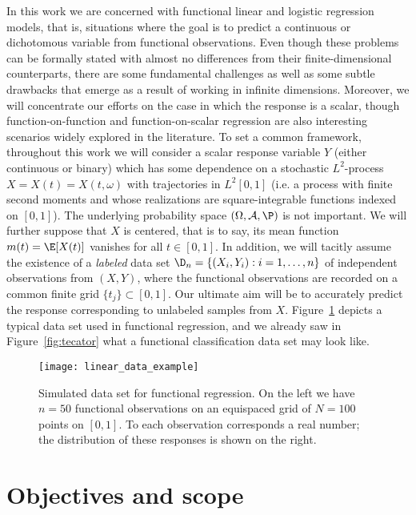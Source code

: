 In this work we are concerned with functional linear and logistic regression models, that is, situations where the goal is to predict a continuous or dichotomous variable from functional observations. Even though these problems can be formally stated with almost no differences from their finite-dimensional counterparts, there are some fundamental challenges as well as some subtle drawbacks that emerge as a result of working in infinite dimensions. Moreover, we will concentrate our efforts on the case in which the response is a scalar, though function-on-function and function-on-scalar regression are also interesting scenarios widely explored in the literature. To set a common framework, throughout this work we will consider a scalar response variable \(Y\) (either continuous or binary) which has some dependence on a stochastic \(L^2\)-process \(X=X(t)=X(t, \omega)\) with trajectories in \(L^2[0, 1]\) (i.e. a process with finite second moments and whose realizations are square-integrable functions indexed on \([0,1]\)). The underlying probability space \((\Omega, \mathcal A, \P)\) is not important. We will further suppose that \(X\) is centered, that is to say, its mean function \(m(t)=\E[X(t)]\) vanishes for all \(t\in[0,1]\). In addition, we will tacitly assume the existence of a \textit{labeled} data set \(\D_n =\{(X_i, Y_i): i=1,\dots, n\}\) of independent observations from \((X, Y)\), where the functional observations are recorded on a common finite grid \(\{t_j\}\subset [0, 1]\). Our ultimate aim will be to accurately predict the response corresponding to unlabeled samples from \(X\). Figure~\ref{fig:linear_data_example} depicts a typical data set used in functional regression, and we already saw in Figure~\ref{fig:tecator} what a functional classification data set may look like.

\enlargethispage{1\baselineskip}

\begin{figure}[htbp!]
  \centering
  \texttt{[image: linear\_data\_example]}
  \caption{Simulated data set for functional regression. On the left we have \(n=50\) functional observations on an equispaced grid of \(N=100\) points on \([0,1]\). To each observation corresponds a real number; the distribution of these responses is shown on the right.}\label{fig:linear_data_example}
\end{figure}


\section{Objectives and scope}

